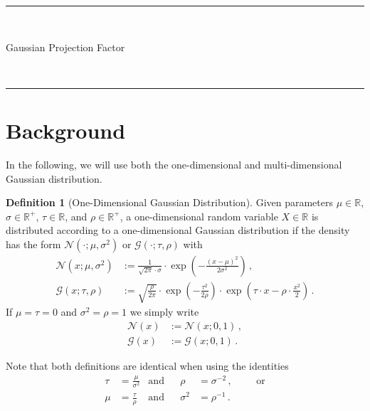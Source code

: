 \documentclass[a4paper]{article}
\newcommand{\Real}{{\mathbb R}}
\newcommand{\Normal}[3]{{\mathcal N} \left({#1};{#2},{#3}\right)}
\newcommand{\Gauss}[3]{{\mathcal G} \left({#1};{#2},{#3}\right)}
\newcommand{\NormalStandard}[1]{{\mathcal N} \left({#1}\right)}
\newcommand{\GaussStandard}[1]{{\mathcal G} \left({#1}\right)}
\theoremstyle{definition}
\newtheorem{definition}{Definition}
\begin{document}
\fancyhead[C]{}
\hrule \medskip
\begin{minipage}{0.295\textwidth}
    \raggedright
    \hfill\\
\end{minipage}
\begin{minipage}{0.4\textwidth}
    \centering
    \large
    Gaussian Projection Factor\\
\end{minipage}
\begin{minipage}{0.295\textwidth}
    \raggedleft
    \hfill\\
\end{minipage}
\medskip\hrule
\bigskip
 
\section*{Background}
In the following, we will use both the one-dimensional and multi-dimensional Gaussian distribution.
\begin{definition}[One-Dimensional Gaussian Distribution]
    Given parameters $\mu \in \Real$, $\sigma \in \Real^+$, $\tau \in \Real$, and $\rho \in \Real^+$, a one-dimensional random variable $X \in \Real$ is distributed according to a one-dimensional Gaussian distribution if the density has the form $\Normal{\cdot}{\mu}{\sigma^2}$ or $\Gauss{\cdot}{\tau}{\rho}$ with
    \begin{align}
        \Normal{x}{\mu}{\sigma^2} & := \frac{1}{\sqrt{2\pi}\cdot \sigma} \cdot \exp \left( -\frac{(x-\mu)^2}{2\sigma^2}\right) \,, \label{eq:1D_Normal_definition} \\
        \Gauss{x}{\tau}{\rho}     & := \sqrt{\frac{\rho}{2\pi}} \cdot \exp\left(-\frac{\tau^2}{2\rho} \right) \cdot \exp \left(\tau\cdot x - \rho \cdot \frac{x^2}{2} \right) \,. \label{eq:1D_Gauss_definition}
    \end{align}
    If $\mu = \tau = 0$ and $\sigma^2 = \rho = 1$ we simply write 
    \begin{align*}
        \NormalStandard{x} & := \Normal{x}{0}{1} \,, \\
        \GaussStandard{x}  & := \Gauss{x}{0}{1} \,.
    \end{align*}
\end{definition}
Note that both definitions are identical when using the identities
\begin{align}
    \tau & = \frac{\mu}{\sigma^2} & \mbox{and} &  & \rho     & = \sigma^{-2}\,,                                       &  &  & \mbox{or} \\
    \mu  & = \frac{\tau}{\rho}    & \mbox{and} &  & \sigma^2 & = \rho^{-1} \,. \label{eq:1D_Gauss_Normal_transformation}
\end{align}
\end{document}
